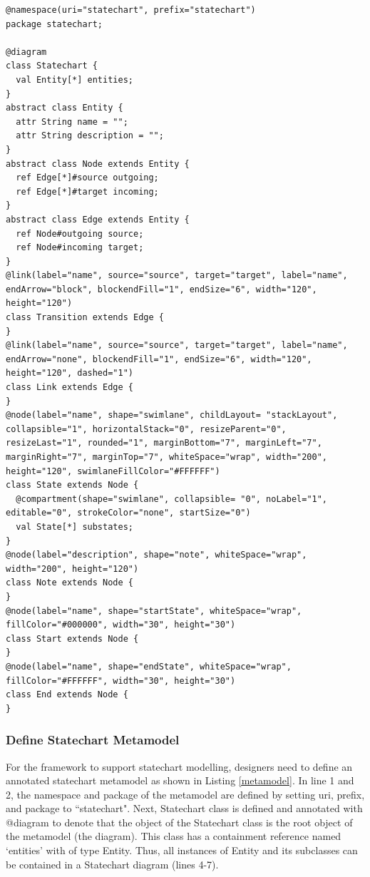 \documentclass[12pt, a4paper]{report} \usepackage[titletoc]{appendix}
\begin{document}
\begin{lstlisting}[style=interfaces,caption={A definition of statechart diagram using Emfatic and Eugenia-like annotations.},label=metamodel]
@namespace(uri="statechart", prefix="statechart")
package statechart;

@diagram
class Statechart {
  val Entity[*] entities;
}
abstract class Entity {
  attr String name = "";
  attr String description = "";
}
abstract class Node extends Entity {
  ref Edge[*]#source outgoing;
  ref Edge[*]#target incoming;
}
abstract class Edge extends Entity {
  ref Node#outgoing source;
  ref Node#incoming target;
}
@link(label="name", source="source", target="target", label="name", endArrow="block", blockendFill="1", endSize="6", width="120", height="120")
class Transition extends Edge {
}
@link(label="name", source="source", target="target", label="name", endArrow="none", blockendFill="1", endSize="6", width="120", height="120", dashed="1")
class Link extends Edge {
}
@node(label="name", shape="swimlane", childLayout= "stackLayout", collapsible="1", horizontalStack="0", resizeParent="0", resizeLast="1", rounded="1", marginBottom="7", marginLeft="7", marginRight="7", marginTop="7", whiteSpace="wrap", width="200", height="120", swimlaneFillColor="#FFFFFF")
class State extends Node {
  @compartment(shape="swimlane", collapsible= "0", noLabel="1", editable="0", strokeColor="none", startSize="0")
  val State[*] substates;
}
@node(label="description", shape="note", whiteSpace="wrap", width="200", height="120")
class Note extends Node {
}
@node(label="name", shape="startState", whiteSpace="wrap", fillColor="#000000", width="30", height="30")
class Start extends Node {
}
@node(label="name", shape="endState", whiteSpace="wrap", fillColor="#FFFFFF", width="30", height="30")
class End extends Node {
}
\end{lstlisting} 

\subsubsection{Define Statechart Metamodel}
For the framework to support statechart modelling, designers need to define an annotated statechart metamodel as shown in Listing \ref{metamodel}. In line 1 and 2, the namespace and package of the metamodel are defined by setting uri, prefix, and package to ``statechart". Next, Statechart class is defined and annotated with {\selectfont @diagram} to denote that the object of the Statechart class is the root object of the metamodel (the diagram). This class has a containment reference named `entities' with of type Entity. Thus, all instances of Entity and its subclasses can be contained in a Statechart diagram (lines 4-7).  
\end{document}
